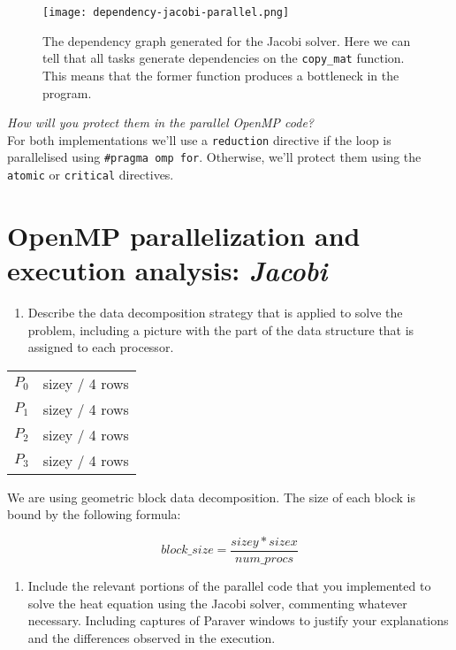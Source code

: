 \documentclass{report}
\begin{document}
\begin{figure}[ht]
  \centering
    \texttt{[image: dependency-jacobi-parallel.png]}
    \caption{The dependency graph generated for the Jacobi solver. Here we can tell that all tasks generate dependencies on the \texttt{copy\_mat} function. This means that the former function produces a bottleneck in the program.}
\end{figure}

\clearpage

\emph{How will you protect them in the parallel OpenMP code?}
\\
For both implementations we'll use a \texttt{reduction} directive if the loop is parallelised using \texttt{\#pragma omp for}. Otherwise, we’ll protect them using the \texttt{atomic} or \texttt{critical} directives.

\chapter{OpenMP parallelization and execution analysis: \textit{Jacobi}}
\begin{enumerate}
  \item Describe the data decomposition strategy that is applied to solve the problem, including a picture with the part of the data structure that is assigned to each processor.
\end{enumerate}

\begin{center}
\begin{tabular}{ l | r |}
  \cline{2-2}
  \(\displaystyle P_{0}\) & sizey / 4 rows \\
  \cline{2-2}
  \(\displaystyle P_{1}\) & sizey / 4 rows \\
  \cline{2-2}
  \(\displaystyle P_{2}\) & sizey / 4 rows \\
  \cline{2-2}
  \(\displaystyle P_{3}\) & sizey / 4 rows \\
  \cline{2-2}
\end{tabular}
\end{center}

We are using geometric block data decomposition. The size of each block is bound by the following formula:

$$
block\_size =  \frac{sizey * sizex}{num\_procs}
$$

\begin{enumerate}[resume]
  \item Include the relevant portions of the parallel code that you implemented to solve the heat equation
  using the Jacobi solver, commenting whatever necessary.  Including captures of Paraver windows to justify your explanations and the differences observed in the execution.
\end{enumerate}
\end{document}
